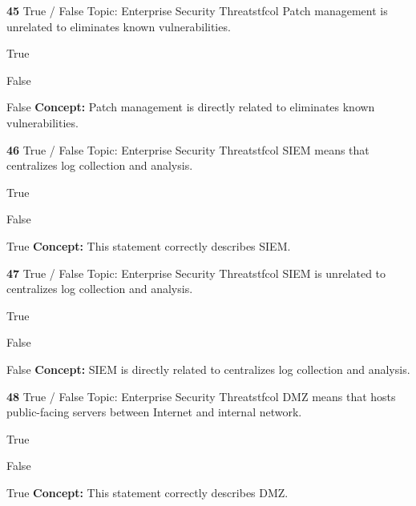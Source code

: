\documentclass[10pt,a4paper]{article}
\begin{document}
\begin{qcard}{\color{white}\textbf{45} \hfill \small True / False \textbar{} Topic: Enterprise Security Threats}{tfcol}
Patch management is unrelated to eliminates known vulnerabilities.

\begin{qoptions}
\item True
\item False
\end{qoptions}
\begin{explainbox}{False}
\textbf{Concept:} Patch management is directly related to eliminates known vulnerabilities.
\end{explainbox}
\end{qcard}

\begin{qcard}{\color{white}\textbf{46} \hfill \small True / False \textbar{} Topic: Enterprise Security Threats}{tfcol}
SIEM means that centralizes log collection and analysis.

\begin{qoptions}
\item True
\item False
\end{qoptions}
\begin{explainbox}{True}
\textbf{Concept:} This statement correctly describes SIEM.
\end{explainbox}
\end{qcard}

\begin{qcard}{\color{white}\textbf{47} \hfill \small True / False \textbar{} Topic: Enterprise Security Threats}{tfcol}
SIEM is unrelated to centralizes log collection and analysis.

\begin{qoptions}
\item True
\item False
\end{qoptions}
\begin{explainbox}{False}
\textbf{Concept:} SIEM is directly related to centralizes log collection and analysis.
\end{explainbox}
\end{qcard}

\begin{qcard}{\color{white}\textbf{48} \hfill \small True / False \textbar{} Topic: Enterprise Security Threats}{tfcol}
DMZ means that hosts public-facing servers between Internet and internal network.

\begin{qoptions}
\item True
\item False
\end{qoptions}
\begin{explainbox}{True}
\textbf{Concept:} This statement correctly describes DMZ.
\end{explainbox}
\end{qcard}
\end{document}
